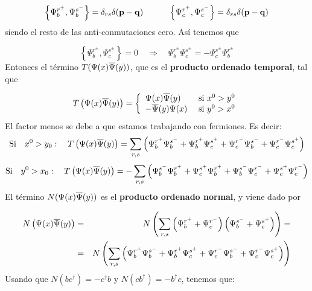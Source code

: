 \begin{solucion}
	\begin{equation*}
		\left\lbrace \Psi_b^{r^+}, \Psi_b^{s^-} \right\rbrace = \delta_{rs} \delta (\mathbf{p}-\mathbf{q}) \quad \quad \quad 
		\left\lbrace \Psi_c^{r^+}, \Psi_c^{s^-}\right\rbrace = \delta_{rs} \delta (\mathbf{p}-\mathbf{q}) 
	\end{equation*} 
	siendo el resto de las anti-conmutaciones cero. Así tenemos que
	
	\begin{equation*}
		\left\lbrace \Psi_b^{r^\pm}, \Psi_c^{s^\pm}\right\rbrace = 0 \quad \Rightarrow \quad  \Psi_b^{r^\pm}\Psi_c^{s^\pm} =- \Psi_c^{s^\pm}\Psi_b^{r^\pm}
	\end{equation*}	Entonces el término $T(\Psi(x)\overline{\Psi}(y))$, que es el \textbf{producto ordenado temporal}, tal que
	
	\begin{equation*}
		T\left( \Psi(x)\overline{\Psi}(y) \right) = \left\lbrace \begin{array}{ll}
			\Psi (x) \overline{\Psi} (y) & \ \text{si} \ x^0>y^0 \\
			-\overline{\Psi} (y) \Psi (x) & \ \text{si} \ y^0>x^0 \\
		\end{array} \right.
	\end{equation*}
	El factor menos se debe a que estamos trabajando con fermiones.	Es decir:
	\begin{equation*}
		\text{Si} \quad x^0 > y_0: \quad	T\left( \Psi(x)\overline{\Psi}(y) \right) = \sum_{r,s}\left(  \Psi_b^{r^+} \Psi_b^{s^-} +  \Psi_b^{r^+}\Psi_c^{s^+} + \Psi_c^{r^-} \Psi_b^{s^-} + \Psi_c^{r^-}\Psi_c^{s^+} \right)
	\end{equation*}
	\begin{equation*}
		\text{Si} \quad y^0 > x_0: \quad 	T\left( \Psi(x)\overline{\Psi}(y) \right) = - \sum_{r,s}\left(  \Psi_b^{s^-} \Psi_b^{r^+} +  \Psi_c^{s^+}\Psi_b^{r^+} + \Psi_b^{s^-} \Psi_c^{r^-} + \Psi_c^{s^+}\Psi_c^{r^-} \right)
	\end{equation*}
	El término $N(\Psi(x)\overline{\Psi}(y))$ es el \textbf{producto ordenado normal}, y viene dado por 
	
	\begin{eqnarray*}
		N\left( \Psi(x)\overline{\Psi}(y) \right) & =  & 
		N\left( \sum_{r,s}\left(  \Psi_b^{r^+} + \Psi_c^{r^-} \right)\left( \Psi_b^{s^-}+\Psi_c^{s^+} \right)  \right) = \\
		& = & N\left( \sum_{r,s} \left(  \Psi_b^{r^+} \Psi_b^{s^-} +  \Psi_b^{r^+}\Psi_c^{s^+} + \Psi_c^{r^-} \Psi_b^{s^-} + \Psi_c^{r^-}\Psi_c^{s^+} \right) \right)
	\end{eqnarray*}
	Usando que $N(bc^\dagger)=-c^\dagger b$ y $N(cb^\dagger)=-b^\dagger c$, tenemos que:
	

\end{solucion}
